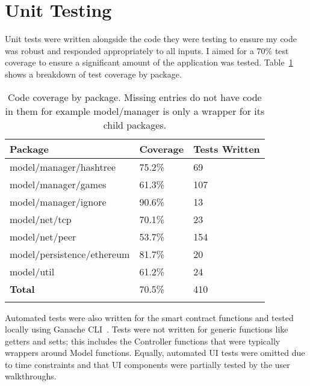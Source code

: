 \section{Unit Testing}

Unit tests were written alongside the code they were testing to ensure my code was robust and responded appropriately to all inputs. I aimed for a 70\% test coverage to ensure a significant amount of the application was tested. Table~\ref{tab:coverage} shows a breakdown of test coverage by package.

\begin{longtable}{p{} p{} p{}}
  \toprule
  \textbf{Package} & \textbf{Coverage} & \textbf{Tests Written}
  \\\midrule\midrule
  model/manager/hashtree
  & 75.2\%
  & 69
  \\
  model/manager/games
  & 61.3\%
  & 107
  \\
  model/manager/ignore
  & 90.6\%
  & 13
  \\
  model/net/tcp
  & 70.1\%
  & 23
  \\
  model/net/peer
  & 53.7\%
  & 154
  \\
  model/persistence/ethereum
  & 81.7\%
  & 20
  \\
  model/util
  & 61.2\%
  & 24
  \\\midrule\midrule
  \textbf{Total}
  & 70.5\%
  & 410
  \\\bottomrule\bottomrule
  \caption{Code coverage by package. Missing entries do not have code in them for example model/manager is only a wrapper for its child packages.}
  \label{tab:coverage}
\end{longtable}

\newparagraph
Automated tests were also written for the smart contract functions and tested locally using Ganache CLI~\cite{noauthor_trufflesuiteganache_2023}. 
Tests were not written for generic functions like getters and setts; this includes the Controller functions that were typically wrappers around Model functions. Equally, automated UI tests were omitted due to time constraints and that UI components were partially tested by the user walkthroughs.